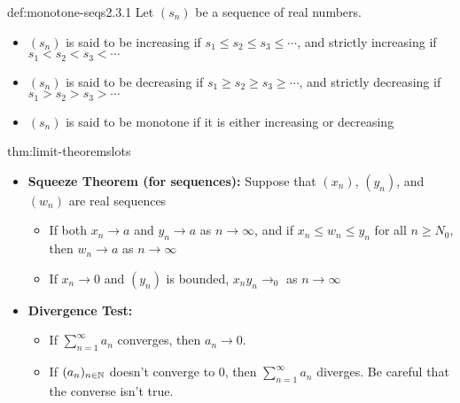 \documentclass[landscape, 8pt]{extarticle}
\begin{document}
\begin{multicols}{3}
\begin{dfn}{def:monotone-seqs}{2.3.1}
    Let $(s_{n})$ be a sequence of real numbers.
    \renewcommand\labelitemi{\tiny$\bullet$}
    \begin{itemize}
        \setlength\itemsep{0em}
        \item $(s_{n})$ is said to be increasing if $s_{1}\le s_{2}\le s_{3}\le\cdots$, and strictly increasing if $s_{1}<s_{2}<s_{3}<\cdots$
        \item $(s_{n})$ is said to be decreasing if $s_{1}\ge s_{2}\ge s_{3}\ge\cdots$, and strictly decreasing if $s_{1}>s_{2}>s_{3}>\cdots$
        \item $(s_{n})$ is said to be monotone if it is either increasing or decreasing
    \end{itemize}
\end{dfn}
\vspace{-5pt}


\begin{thm}{thm:limit-theorems}{lots}
\renewcommand\labelitemi{\tiny$\bullet$}
\begin{itemize}
    \setlength\itemsep{0em}
    
    \item \textbf{Squeeze Theorem (for sequences):} Suppose that $(x_{n})$, $(y_{n})$, and $(w_{n})$ are real sequences
    \vspace{-5pt}
    \renewcommand\labelitemi{\tiny$\bullet$}
    \begin{itemize}
        \setlength\itemsep{0em}
        \item If both $x_{n}\to a$ and $y_{n} \to a$ as $n\to\infty$, and if $x_{n}\le w_{n}\le y_{n}$ for all $n\ge N_{0}$, then $w_{n}\to a$ as $n\to\infty$
        \item If $x_{n}\to 0$ and $(y_{n})$ is bounded, $x_{n}y_{n}\to_{0}$ as $n\to\infty$
    \end{itemize}
    \vspace{-5pt}
    
    \item \textbf{Divergence Test:}
    \vspace{-5pt}
    \renewcommand\labelitemi{\tiny$\bullet$}
    \begin{itemize}
        \setlength\itemsep{0em}
        \item If $\sum^{\infty}_{n=1} a_n$ converges, then $a_n\to0$.
        \item If $(a_n)_{n\in\mathbb{N}}$ doesn't converge to $0$, then $\sum_{n=1}^{\infty} a_n$ diverges. Be careful that the converse isn't true.
    \end{itemize}
    \vspace{-5pt}
    

\end{itemize}
\end{thm}
\end{multicols}
\end{document}
